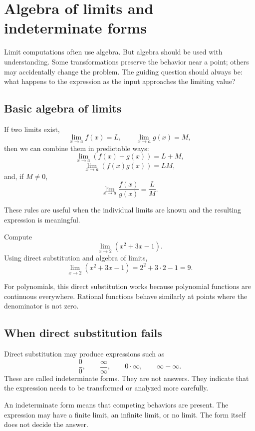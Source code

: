 \section{Algebra of limits and indeterminate forms}

Limit computations often use algebra. But algebra should be used with understanding. Some transformations preserve the behavior near a point; others may accidentally change the problem. The guiding question should always be: what happens to the expression as the input approaches the limiting value?

\subsection*{Basic algebra of limits}

If two limits exist,
\[
\lim_{x\to a}f(x)=L,
\qquad
\lim_{x\to a}g(x)=M,
\]
then we can combine them in predictable ways:
\[
\lim_{x\to a}(f(x)+g(x))=L+M,
\]
\[
\lim_{x\to a}(f(x)g(x))=LM,
\]
and, if \(M\ne0\),
\[
\lim_{x\to a}\frac{f(x)}{g(x)}=\frac{L}{M}.
\]

These rules are useful when the individual limits are known and the resulting expression is meaningful.

\begin{examplebox}
Compute
\[
\lim_{x\to2}(x^2+3x-1).
\]
Using direct substitution and algebra of limits,
\[
\lim_{x\to2}(x^2+3x-1)=2^2+3\cdot2-1=9.
\]
\end{examplebox}

For polynomials, this direct substitution works because polynomial functions are continuous everywhere. Rational functions behave similarly at points where the denominator is not zero.

\subsection*{When direct substitution fails}

Direct substitution may produce expressions such as
\[
\frac00,
\qquad
\frac{\infty}{\infty},
\qquad
0\cdot\infty,
\qquad
\infty-\infty.
\]
These are called indeterminate forms. They are not answers. They indicate that the expression needs to be transformed or analyzed more carefully.

\begin{remarkbox}
An indeterminate form means that competing behaviors are present. The expression may have a finite limit, an infinite limit, or no limit. The form itself does not decide the answer.
\end{remarkbox}

